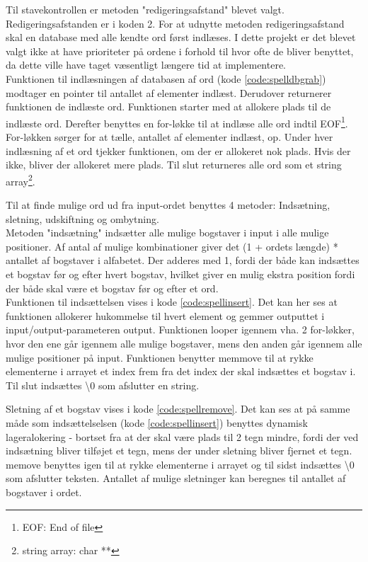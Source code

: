 Til stavekontrollen er metoden "redigeringsafstand" blevet valgt. Redigeringsafstanden er i koden 2. For at udnytte metoden redigeringsafstand skal en database med alle kendte ord først indlæses. I dette projekt er det blevet valgt ikke at have prioriteter på ordene i forhold til hvor ofte de bliver benyttet, da dette ville have taget væsentligt længere tid at implementere.\\

Funktionen til indlæsningen af databasen af ord (kode \ref{code:spelldbgrab}) modtager en pointer til antallet af elementer indlæst. Derudover returnerer funktionen de indlæste ord. Funktionen starter med at allokere plads til de indlæste ord. Derefter benyttes en for-løkke til at indlæse alle ord indtil EOF\footnote{EOF: End of file}. For-løkken sørger for at tælle, antallet af elementer indlæst, op. Under hver indlæsning af et ord tjekker funktionen, om der er allokeret nok plads. Hvis der ikke, bliver der allokeret mere plads. Til slut returneres alle ord som et string array\footnote{string array: char **}.


Til at finde mulige ord ud fra input-ordet benyttes 4 metoder: Indsætning, sletning, udskiftning og ombytning.\\

Metoden "indsætning" indsætter alle mulige bogstaver i input i alle mulige positioner. Af antal af mulige kombinationer giver det (1 + ordets længde) * antallet af bogstaver i alfabetet. Der adderes med 1, fordi der både kan indsættes et bogstav før og efter hvert bogstav, hvilket giver en mulig ekstra position fordi der både skal være et bogstav før og efter et ord.\\

Funktionen til indsættelsen vises i kode \ref{code:spellinsert}. Det kan her ses at funktionen allokerer hukommelse til hvert element og gemmer outputtet i input/output-parameteren output. Funktionen looper igennem vha. 2 for-løkker, hvor den ene går igennem alle mulige bogstaver, mens den anden går igennem alle mulige positioner på input. Funktionen benytter memmove til at rykke elementerne i arrayet et index frem fra det index der skal indsættes et bogstav i. Til slut indsættes \textbackslash0 som afslutter en string.


Sletning af et bogstav vises i kode \ref{code:spellremove}. Det kan ses at på samme måde som indsættelselsen (kode \ref{code:spellinsert}) benyttes dynamisk lageralokering - bortset fra at der skal være plads til 2 tegn mindre, fordi der ved indsætning bliver tilføjet et tegn, mens der under sletning bliver fjernet et tegn. memove benyttes igen til at rykke elementerne i arrayet og til sidst indsættes \textbackslash0 som afslutter teksten. Antallet af mulige sletninger kan beregnes til antallet af bogstaver i ordet.

